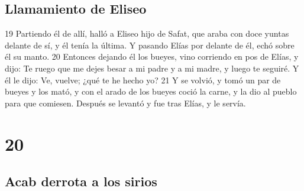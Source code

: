\section*{Llamamiento de Eliseo}

19 Partiendo él de allí, halló a Eliseo hijo de Safat, que araba con doce yuntas delante de sí, y él tenía la última. Y pasando Elías por delante de él, echó sobre él su manto.
20 Entonces dejando él los bueyes, vino corriendo en pos de Elías, y dijo: Te ruego que me dejes besar a mi padre y a mi madre, y luego te seguiré. Y él le dijo: Ve, vuelve; ¿qué te he hecho yo?
21 Y se volvió, y tomó un par de bueyes y los mató, y con el arado de los bueyes coció la carne, y la dio al pueblo para que comiesen. Después se levantó y fue tras Elías, y le servía.

\chapter{20}

\section*{Acab derrota a los sirios }


